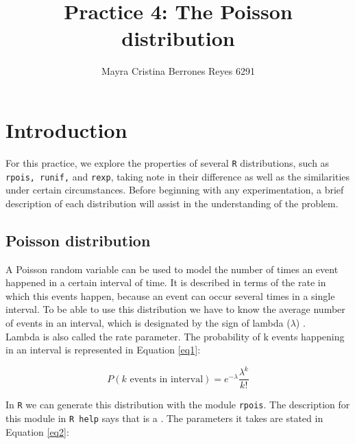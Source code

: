 \documentclass{article}
\begin{document}
\title{%
  Practice 4: The Poisson distribution} %
\author{Mayra Cristina Berrones Reyes 6291}

\maketitle

\section{Introduction}

For this practice, we explore the properties of several \texttt{R} distributions, such as \texttt{rpois, runif,} and \texttt{rexp}, taking note in their difference as well as the similarities under certain circumstances. Before beginning with any experimentation, a brief description of each distribution will assist in the understanding of the problem.\\

\subsection{Poisson distribution}

A Poisson random variable can be used to model the number of times an event happened in a certain interval of time. It is described in terms of the rate in which this events happen, because an event can occur several times in a single interval. To be able to use this distribution we have to know the average number of events in an interval, which is designated by the sign of lambda ($\lambda$) \cite{poison}.\\

Lambda is also called the rate parameter. The probability of k events happening in an interval is represented in Equation \ref{eq1}:

\begin{equation} \label{eq1}
P(k \mbox{ events in interval}) = e^{-\lambda}\frac{\lambda^k}{k!}
\end{equation}

\smallskip

In \texttt{R} we can generate this distribution with the module \texttt{rpois}. The description for this module in \texttt{R help} says that is a  \cite{rpois}. The parameters it takes are stated in Equation \ref{eq2}:
\end{document}
